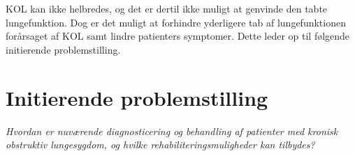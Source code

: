 KOL kan ikke helbredes, og det er dertil ikke muligt at genvinde den tabte lungefunktion. Dog er det muligt at forhindre yderligere tab af lungefunktionen forårsaget af KOL samt lindre patienters symptomer.\cite{Basisbogen2016} Dette leder op til følgende initierende problemstilling.


\section{Initierende problemstilling}
\textit{Hvordan er nuværende diagnosticering og behandling af patienter med kronisk obstruktiv lungesygdom, og hvilke rehabiliteringsmuligheder kan tilbydes?}